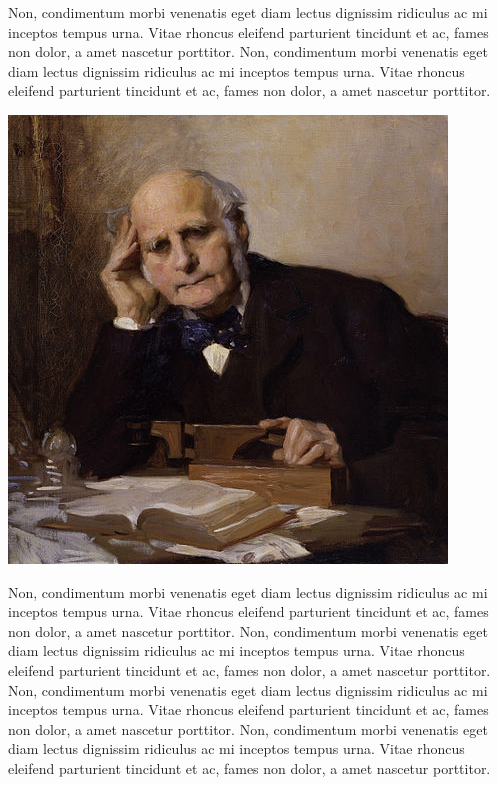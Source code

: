 \documentclass[
  oneside,
  12pt]{crumpbook}
\newenvironment{floatrightbox25}{%
  \wrapfigure{R}{.25\textwidth}%
  }{%
  \endwrapfigure}
\begin{document}
Non, condimentum morbi venenatis eget diam lectus dignissim ridiculus ac mi inceptos tempus urna. Vitae rhoncus eleifend parturient tincidunt et ac, fames non dolor, a amet nascetur porttitor. Non, condimentum morbi venenatis eget diam lectus dignissim ridiculus ac mi inceptos tempus urna. Vitae rhoncus eleifend parturient tincidunt et ac, fames non dolor, a amet nascetur porttitor.

\begin{floatrightbox25}
\includegraphics[width=1\linewidth]{imgs/Francis_Galton}

\end{floatrightbox25}

Non, condimentum morbi venenatis eget diam lectus dignissim ridiculus ac mi inceptos tempus urna. Vitae rhoncus eleifend parturient tincidunt et ac, fames non dolor, a amet nascetur porttitor. Non, condimentum morbi venenatis eget diam lectus dignissim ridiculus ac mi inceptos tempus urna. Vitae rhoncus eleifend parturient tincidunt et ac, fames non dolor, a amet nascetur porttitor. Non, condimentum morbi venenatis eget diam lectus dignissim ridiculus ac mi inceptos tempus urna. Vitae rhoncus eleifend parturient tincidunt et ac, fames non dolor, a amet nascetur porttitor. Non, condimentum morbi venenatis eget diam lectus dignissim ridiculus ac mi inceptos tempus urna. Vitae rhoncus eleifend parturient tincidunt et ac, fames non dolor, a amet nascetur porttitor.
\end{document}

